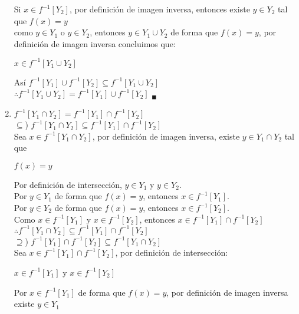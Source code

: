 \documentclass[12pt]{article}
\begin{document}
\begin{enumerate}[label=\alph*)]
    Si $x \in f^{-1}[Y_2]$, por definición de imagen inversa, entonces existe $y \in Y_2$ tal que $f(x) = y$\\

    como $y \in Y_1$ o $y \in Y_2$, entonces $y \in Y_1 \cup Y_2$ de forma que $f(x) = y$, por definición de imagen inversa concluimos que:
    \begin{center}
        $x \in f^{-1}[Y_1 \cup Y_2]$
    \end{center}
    Así $f^{-1}[Y_1] \cup f^{-1}[Y_2] \subseteq f^{-1} [Y_1 \cup Y_2]$\\

    $\therefore f^{-1} [Y_1 \cup Y_2] =  f^{-1}[Y_1] \cup f^{-1}[Y_2]$ $_\blacksquare$

    \item ${\displaystyle f^{-1}} [Y_1 \cap Y_2] = {\displaystyle f^{-1}}[Y_1] \cap {\displaystyle f^{-1}}[Y_2]$\\

    $\subseteq$) $f^{-1} [Y_1 \cap Y_2] \subseteq  f^{-1}[Y_1] \cap f^{-1}[Y_2]$\\

    Sea $x \in f^{-1} [Y_1 \cap Y_2]$, por definición de imagen inversa, existe $y \in Y_1 \cap Y_2$ tal que
    \begin{center}
        $f(x) = y$
    \end{center}
    Por definición de intersección, $y \in Y_1$ y $y \in Y_2$.\\

    Por $y \in Y_1$ de forma que $f(x) = y$, entonces $x \in f^{-1}[Y_1]$.\\

    Por $y \in Y_2$ de forma que $f(x) = y$, entonces $x \in f^{-1}[Y_2]$.\\

    Como  $x \in f^{-1}[Y_1]$ y $x \in f^{-1}[Y_2]$, entonces $x \in f^{-1}[Y_1] \cap f^{-1}[Y_2]$\\

    $\therefore f^{-1} [Y_1 \cap Y_2] \subseteq  f^{-1}[Y_1] \cap f^{-1}[Y_2]$\\

    $\supseteq$)  $f^{-1}[Y_1] \cap f^{-1}[Y_2] \subseteq f^{-1} [Y_1 \cap Y_2]$\\

    Sea $x \in f^{-1}[Y_1] \cap f^{-1}[Y_2]$, por definición de intersección:
    \begin{center}
        $x \in f^{-1}[Y_1]$ y $x \in f^{-1}[Y_2]$
    \end{center}
    Por  $x \in f^{-1}[Y_1]$ de forma que $f(x) = y$, por definición de imagen inversa existe $y \in Y_1$\\


\end{enumerate}
\end{document}
